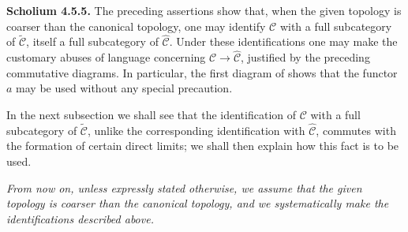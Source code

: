 \medskip
\noindent{}\textbf{Scholium 4.5.5.}
The preceding assertions show that, when the given topology is coarser than
the canonical topology, one may identify \(\mathscr C\) with a full
subcategory of \(\widetilde{\mathscr C}\), itself a full subcategory of
\(\widehat{\mathscr C}\). Under these identifications one may make the
customary abuses of language concerning \(\mathscr C\to
\widehat{\mathscr C}\), justified by the preceding commutative diagrams.
In particular, the first diagram of  shows that the functor \(a\) may
be used without any special precaution.

In the next subsection we shall see that the identification of
\(\mathscr C\) with a full subcategory of \(\widetilde{\mathscr C}\),
unlike the corresponding identification with
\(\widehat{\mathscr C}\), commutes with the formation of certain direct
limits; we shall then explain how this fact is to be used.

\emph{From now on, unless expressly stated otherwise, we assume that the
given topology is coarser than the canonical topology, and we
systematically make the identifications described above.}
